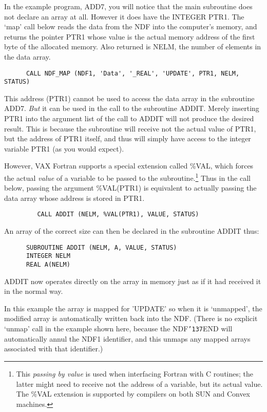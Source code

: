 \documentclass[twoside,11pt]{article}
\renewcommand{\_}{{\tt\char'137}}
\begin{document}
In the example program, ADD7, you will notice that the main subroutine does not
declare an array at all.
However it does have the INTEGER PTR1.
The `map' call below reads the data from the NDF into the computer's
memory, and
returns the pointer PTR1 whose value  is the actual memory address of
the first byte of the allocated memory.
Also returned is NELM, the number of elements in the data array.
\begin{verbatim}
      CALL NDF_MAP (NDF1, 'Data', '_REAL', 'UPDATE', PTR1, NELM, STATUS)
\end{verbatim}
This address (PTR1) cannot be used to access  the data array in the subroutine
ADD7.
{\sl But\/} it can be used in the call to the subroutine ADDIT.
Merely inserting PTR1 into the argument list of the call to
ADDIT will not produce the desired result.
This is  because the subroutine will receive not
the actual value of PTR1,
but the address of PTR1 itself, and thus will simply have access to
the integer variable PTR1  (as you would expect).

However, VAX Fortran supports a special extension called \%VAL, which forces
the actual  {\sl value\/}
of a variable to be passed to the
subroutine.\footnote{This {\sl passing by value\/} is used when interfacing
Fortran
with C routines; the latter might need to receive not the address of a
variable, but its actual value.
The \%VAL extension is supported by compilers on both SUN and Convex machines.}
Thus in  the call below, passing the argument \%VAL(PTR1) is equivalent
to actually passing the data array whose address is stored in PTR1.
\begin{verbatim}
         CALL ADDIT (NELM, %VAL(PTR1), VALUE, STATUS)
\end{verbatim}
An array of the correct size  can then be declared in the subroutine ADDIT
thus:
\begin{verbatim}
      SUBROUTINE ADDIT (NELM, A, VALUE, STATUS)
      INTEGER NELM
      REAL A(NELM)
\end{verbatim}
ADDIT now operates directly on the array in memory just as if it had
received it in the normal way.

In this example the array is mapped for 'UPDATE' so when it is
`unmapped', the modified array is automatically written back into the NDF.
(There is no explicit `unmap' call in the example shown here,
because the NDF\_END will automatically
annul the NDF1 identifier, and this
unmaps any mapped arrays associated with that identifier.)
\end{document}
